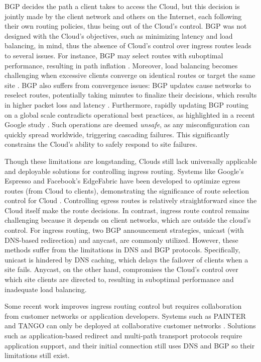 \documentclass[sigconf,nonacm,screen,letterpaper,10pt]{acmart}
\begin{document}
BGP decides the path a client takes to access the Cloud, but this
decision is jointly made by the client network and others on the
Internet, each following their own routing policies, thus being out of
the Cloud's control. BGP was not designed with the Cloud's objectives,
such as minimizing latency and load balancing, in mind, thus the absence
of Cloud's control over ingress routes leads to several issues. For
instance, BGP may select routes with suboptimal performance, resulting
in path inflation
\cite{painter, anycast_matt, anycast_ppp, imc-jc-deanony, tango}.
Moreover, load balancing becomes challenging when excessive clients
converge on identical routes or target the same site
\cite{tipsy, flavel2015fastroute}. BGP also suffers from convergence
issues: BGP updates cause networks to reselect routes, potentially
taking minutes to finalize their decisions, which results in higher
packet loss and latency
\cite{bgp-conv, a-measurement-study-on-the-impact}. Furthermore, rapidly
updating BGP routing on a global scale contradicts operational best
practices, as highlighted in a recent Google study \cite{capa}. Such
operations are deemed \emph{unsafe}, as any misconfiguration can quickly
spread worldwide, triggering cascading failures. This significantly
constrains the Cloud's ability to safely respond to site failures.

Though these limitations are longstanding, Clouds still lack universally
applicable and deployable solutions for controlling ingress routing.
Systems like Google's Espresso and Facebook's EdgeFabric have been
developed to optimize egress routes (from Cloud to clients),
demonstrating the significance of route selection control for Cloud
\cite{yap2017taking, schlinker2017engineering}. Controlling egress
routes is relatively straightforward since the Cloud itself make the
route decisions. In contrast, ingress route control remains challenging
because it depends on client networks, which are outside the cloud's
control. For ingress routing, two BGP announcement strategies, unicast
(with DNS-based redirection) and anycast, are commonly utilized.
However, these methods suffer from the limitations in DNS and BGP
protocols. Specifically, unicast is hindered by DNS caching, which
delays the failover of clients when a site fails. Anycast, on the other
hand, compromises the Cloud's control over which site clients are
directed to, resulting in suboptimal performance and inadequate load
balancing.

Some recent work improves ingress routing control but requires
collaboration from customer networks or application developers. Systems
such as PAINTER and TANGO can only be deployed at collaborative customer
networks \cite{painter,tango-nsdi}. Solutions such as application-based
redirect and multi-path transport protocols require application support,
and their initial connection still uses DNS and BGP so their limitations
still exist.
\end{document}
